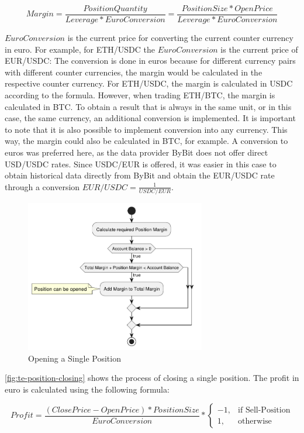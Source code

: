 \[
    Margin = \frac{PositionQuantity}{Leverage * EuroConversion} = \frac{PositionSize * OpenPrice}{Leverage * EuroConversion}
\]

\noindent
$EuroConversion$ is the current price for converting the current counter currency in euro.
For example, for ETH/USDC the $EuroConversion$ is the current price of EUR/USDC:
The conversion is done in euros because for different currency pairs with different counter currencies, the margin would be calculated in the respective counter currency.
For ETH/USDC, the margin is calculated in USDC according to the formula.
However, when trading ETH/BTC, the margin is calculated in BTC.
To obtain a result that is always in the same unit, or in this case, the same currency, an additional conversion is implemented.
It is important to note that it is also possible to implement conversion into any currency.
This way, the margin could also be calculated in BTC, for example.
A conversion to euros was preferred here, as the data provider ByBit does not offer direct USD/USDC rates.
Since USDC/EUR is offered, it was easier in this case to obtain historical data directly from ByBit and obtain the EUR/USDC rate through a conversion $EUR/USDC = \frac{1}{USDC/EUR}$.

\begin{figure}[H]
    \centering
    \includegraphics[width=0.7\textwidth]{images/trading-engine/position-opening}
    \caption{Opening a Single Position}
    \label{fig:te-position-opening}
\end{figure}

\noindent
\autoref{fig:te-position-closing} shows the process of closing a single position.
The profit in euro is calculated using the following formula:

\[
    Profit = \frac{(ClosePrice - OpenPrice) * PositionSize}{EuroConversion} *
    \begin{cases}
        -1,& \text{if Sell-Position}\\
        1,              & \text{otherwise}
    \end{cases}
\]

